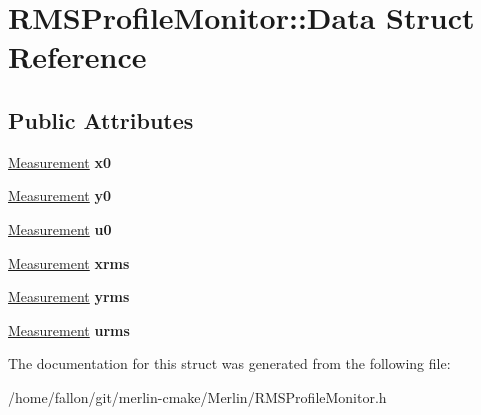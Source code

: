 \hypertarget{structRMSProfileMonitor_1_1Data}{}\section{R\+M\+S\+Profile\+Monitor\+:\+:Data Struct Reference}
\label{structRMSProfileMonitor_1_1Data}
\subsection*{Public Attributes}
\begin{DoxyCompactItemize}
\item 
\mbox{\label{structRMSProfileMonitor_1_1Data_ae3bac40010386599425e6a280bb590b3}} 
\hyperlink{structMeasurement}{Measurement} {\bfseries x0}
\item 
\mbox{\label{structRMSProfileMonitor_1_1Data_a582d4b697561938da71596a2fbf30a27}} 
\hyperlink{structMeasurement}{Measurement} {\bfseries y0}
\item 
\mbox{\label{structRMSProfileMonitor_1_1Data_a0f9755795592629bbbcae93708d43014}} 
\hyperlink{structMeasurement}{Measurement} {\bfseries u0}
\item 
\mbox{\label{structRMSProfileMonitor_1_1Data_a7a78144b06356135cb1208607ba4554a}} 
\hyperlink{structMeasurement}{Measurement} {\bfseries xrms}
\item 
\mbox{\label{structRMSProfileMonitor_1_1Data_ae3a871526fd5c3867bcff28d37ee5c1c}} 
\hyperlink{structMeasurement}{Measurement} {\bfseries yrms}
\item 
\mbox{\label{structRMSProfileMonitor_1_1Data_a7f7e4edbc8489bcca429df67afbcd820}} 
\hyperlink{structMeasurement}{Measurement} {\bfseries urms}
\end{DoxyCompactItemize}


The documentation for this struct was generated from the following file\+:\begin{DoxyCompactItemize}
\item 
/home/fallon/git/merlin-\/cmake/\+Merlin/R\+M\+S\+Profile\+Monitor.\+h\end{DoxyCompactItemize}
